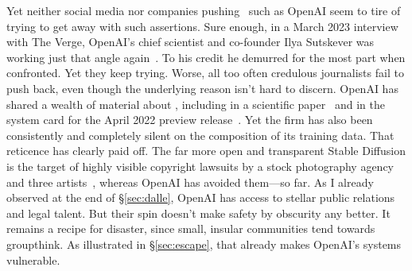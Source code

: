Yet neither social media nor companies pushing \AI\ such as OpenAI seem to tire
of trying to get away with such assertions. Sure enough, in a March 2023
interview with The Verge, OpenAI's chief scientist and co-founder Ilya Sutskever
was working just that angle again~\cite{Vincent2023a}. To his credit he demurred
for the most part when confronted. Yet they keep trying. Worse, all too often
credulous journalists fail to push back, even though the underlying reason isn't
hard to discern. OpenAI has shared a wealth of material about \DALLE, including
in a scientific paper~\cite{RameshDhariwalea2022} and in the system card for the
April 2022 preview release~\cite{MishkinAhmad2022}. Yet the firm has also been
consistently and completely silent on the composition of its training data. That
reticence has clearly paid off. The far more open and transparent Stable
Diffusion is the target of highly visible copyright lawsuits by a stock
photography agency and three artists~\cite{Butterick2023,Setty2023}, whereas
OpenAI has avoided them---so far. As I already observed at the end of
\S\ref{sec:dalle}, OpenAI has access to stellar public relations and legal
talent. But their spin doesn't make safety by obscurity any better. It remains a
recipe for disaster, since small, insular communities tend towards groupthink.
As illustrated in \S\ref{sec:escape}, that already makes OpenAI's systems
vulnerable.


